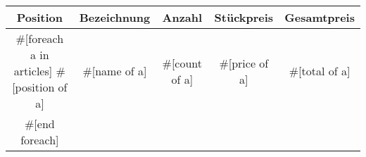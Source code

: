 \documentclass{article}
\begin{document}
\begin{center}
    \begin{tabular}{ c | c | c | c | c }
        \rowcolor{FantappticGreen!50}
        \color{white}Position & \color{white}Bezeichnung & \color{white}Anzahl & \color{white}St\"uckpreis & \color{white}Gesamtpreis \\ [0.25ex] %
        \hline
        #[foreach a in articles]
        #[position of a] & #[name of a] & #[count of a] & #[price of a] & #[total of a] \\ \hline
        #[end foreach]
    \end{tabular}
\end{center}
\end{document}
